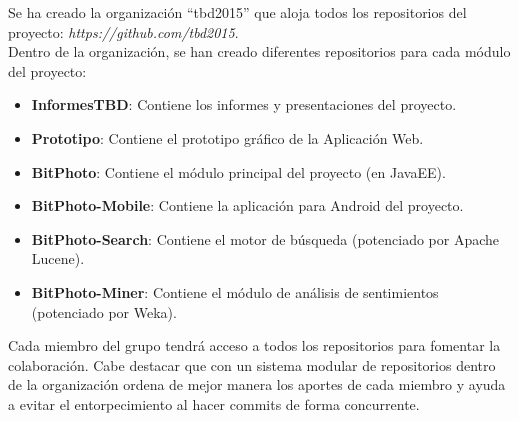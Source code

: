 \documentclass{memoria}
\begin{document}
Se ha creado la organización “tbd2015” que aloja todos los repositorios del proyecto: \textsl{https://github.com/tbd2015}.\\

Dentro de la organización, se han creado diferentes repositorios para cada módulo del proyecto:

\begin{itemize}
	\item \textbf{InformesTBD}: Contiene los informes y presentaciones del proyecto. 
	\item \textbf{Prototipo}: Contiene el prototipo gráfico de la Aplicación Web.
	\item \textbf{BitPhoto}: Contiene el módulo principal del proyecto (en JavaEE).
	\item \textbf{BitPhoto-Mobile}: Contiene la aplicación para Android del proyecto.
	\item \textbf{BitPhoto-Search}: Contiene el motor de búsqueda (potenciado por Apache Lucene).
	\item \textbf{BitPhoto-Miner}: Contiene el módulo de análisis de sentimientos (potenciado por Weka).
\end{itemize}

Cada miembro del grupo tendrá acceso a todos los repositorios para fomentar la colaboración. Cabe destacar que con un sistema modular de repositorios dentro de la organización ordena de mejor manera los aportes de cada miembro y ayuda a evitar el entorpecimiento al hacer commits de forma concurrente.





\end{document}
